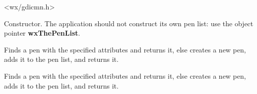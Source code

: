 <wx/gdicmn.h>




\label{wxpenlistctor}


Constructor. The application should not construct its own pen list:
use the object pointer {\bf wxThePenList}.

\label{wxpenlistfindorcreatepen}


Finds a pen with the specified attributes and returns it, else creates a new pen, adds it
to the pen list, and returns it.


Finds a pen with the specified attributes and returns it, else creates a new pen, adds it
to the pen list, and returns it.






